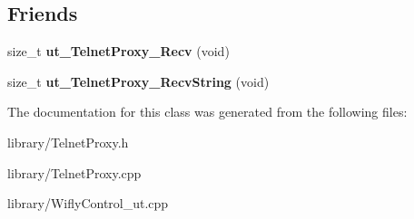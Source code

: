 \subsection*{Friends}
\begin{DoxyCompactItemize}
\item 
\hypertarget{class_telnet_proxy_a436d76cf48d888700dddd5dc72c7bc56}{size\-\_\-t {\bfseries ut\-\_\-\-Telnet\-Proxy\-\_\-\-Recv} (void)}\label{class_telnet_proxy_a436d76cf48d888700dddd5dc72c7bc56}

\item 
\hypertarget{class_telnet_proxy_a899fd61cba9dec179f6a058b25c73cb7}{size\-\_\-t {\bfseries ut\-\_\-\-Telnet\-Proxy\-\_\-\-Recv\-String} (void)}\label{class_telnet_proxy_a899fd61cba9dec179f6a058b25c73cb7}

\end{DoxyCompactItemize}


The documentation for this class was generated from the following files\-:\begin{DoxyCompactItemize}
\item 
library/Telnet\-Proxy.\-h\item 
library/Telnet\-Proxy.\-cpp\item 
library/Wifly\-Control\-\_\-ut.\-cpp\end{DoxyCompactItemize}
